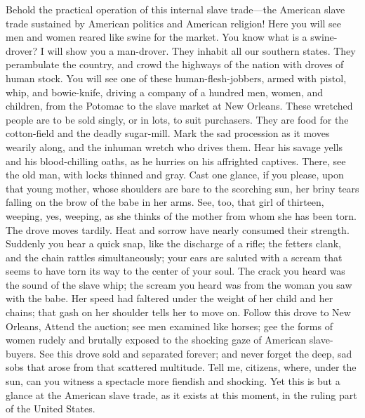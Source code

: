 Behold the practical operation of this internal slave trade---the
American slave trade sustained by American politics and American
religion! Here you will see men and women reared like swine for the
market. You know what is a swine-drover? I will show you
{\protect\hypertarget{447}{}{}}a man-drover. They inhabit all our
southern states. They perambulate the country, and crowd the highways of
the nation with droves of human stock. You will see one of these
human-flesh-jobbers, armed with pistol, whip, and bowie-knife, driving a
company of a hundred men, women, and children, from the Potomac to the
slave market at New Orleans. These wretched people are to be sold
singly, or in lots, to suit purchasers. They are food for the
cotton-field and the deadly sugar-mill. Mark the sad procession as it
moves wearily along, and the inhuman wretch who drives them. Hear his
savage yells and his blood-chilling oaths, as he hurries on his
affrighted captives. There, see the old man, with locks thinned and
gray. Cast one glance, if you please, upon that young mother, whose
shoulders are bare to the scorching sun, her briny tears falling on the
brow of the babe in her arms. See, too, that girl of thirteen, weeping,
yes, weeping, as she thinks of the mother from whom she has been torn.
The drove moves tardily. Heat and sorrow have nearly consumed their
strength. Suddenly you hear a quick snap, like the discharge of a rifle;
the fetters clank, and the chain rattles simultaneously; your ears are
saluted with a scream that seems to have torn its way to the center of
your soul. The crack you heard was the sound of the slave whip; the
scream you heard was from the woman you saw with the babe. Her speed had
faltered under the weight of her child and her chains; that gash on her
shoulder tells her to move on. Follow this drove to New Orleans, Attend
the auction; see men examined like horses; gee the forms of women rudely
and brutally exposed to the shocking gaze of American slave-buyers. See
this drove sold and separated forever; and never forget the deep, sad
sobs that arose from that scattered multitude. Tell me, citizens, where,
under the sun, can you witness a spectacle more fiendish and shocking.
Yet this is but a glance at the American slave trade, as it exists at
this moment, in the ruling part of the United States.


